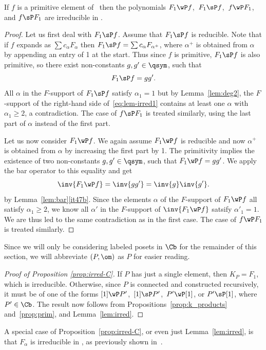 \begin{lemma}\label{lem:irred}
If $f$ is a primitive element of \qsym\  then the polynomials
$F_1\wP f$,\ $F_1\sP f$,\ $f\wP F_1$, and $f\sP F_1$
are irreducible in \qsym.
\end{lemma}
\begin{proof}
Let us first deal with $F_1\sP f$.
Assume that $F_1\sP f$ is reducible. 
Note that if $f$ expands as $\sum c_\alpha F_\alpha$ then $F_1\sP f = \sum c_\alpha F_{\alpha^+}$, where $\alpha^+$ is obtained from $\alpha$ by appending an entry of 1 at the start.  Thus since $f$ is primitive, $F_1\sP f$ is also primitive, so there exist non-constants $g,g'\in \qsym$, such that 
\begin{equation}\label{eq:lem-irred1}
F_1\sP f = g g'.
\end{equation}
All $\alpha$ in the $F$-support of $F_1\sP f$ satisfy $\alpha_1=1$ but by Lemma~\ref{lem:deg2}, the $F$-support of the right-hand side of~\eqref{eq:lem-irred1} contains at least one $\alpha$ with $\alpha_1 \geq 2$, a contradiction.  The case of  $f\sP F_1$ is treated similarly, using the last part of $\alpha$ instead of the first part.

Let us now consider $F_1\wP f$.
We again assume $F_1\wP f$ is reducible and now $\alpha^+$ is obtained from $\alpha$ by increasing the first part by 1.  The primitivity 
implies the existence of two non-constants $g,g'\in \qsym$, 
such that $F_1\wP f = g g'$. We apply the bar operator to this equality
and get 
\[
\inv{F_1\wP f} = \inv{g g'} = \inv{g} \inv{g'}.
\]
by Lemma~\ref{lem:bar}\ref{it47b}. Since the elements $\alpha$ of the $F$-support of $F_1\wP f$ all satisfy $\alpha_1\ge 2$, we know all $\alpha'$ in the $F$-support of 
$\inv{F_1\wP f}$ satsify $\alpha'_1 = 1$.
We are thus led to the same contradiction as in the first case. 
The case of  $f\wP F_1$ is treated similarly.
\end{proof}

Since we will only be considering labeled posets in $\Cb$ for the remainder of this section, we will abbreviate $(P,\om)$ as $P$ for easier reading.

\begin{proof}[Proof of Proposition \ref{prop:irred-C}]
If $P$ has just a single element, then $K_P = F_1$, which is irreducible.  Otherwise, since $P$ is connected and constructed recursively, it must be of one of the forms $[1]\wP P'$,\ $[1]\sP P'$,\ 
$P'\wP [1]$, or $P'\sP [1]$, where $P' \in \Cb$.  The result now follows from Propositions~\ref{prop:k_products} and~\ref{prop:prim}, and Lemma~\ref{lem:irred}.
\end{proof}

\begin{remark}
A special case of Proposition~\ref{prop:irred-C}, or even just Lemma~\ref{lem:irred}, is that $F_\alpha$ is irreducible in \qsym, as previously shown in~\cite{LaPy08}.
\end{remark}
